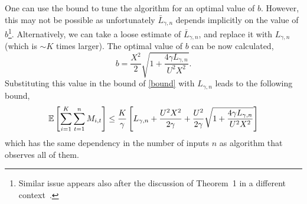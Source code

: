 {One can use the bound to tune the algorithm for an optimal  value of
$b$. However, this may not be possible as unfortunately ${\bar L}_{\gamma,n}$ depends
implicitly on the value of $b$\footnote{Similar issue appears also
  after the discussion of Theorem~1 in a different context~\cite{cesa2006worst}.}.
 Alternatively, we can take a
loose estimate of ${\bar L}_{\gamma,n}$, and replace it with
$L_{\gamma,n}$ (which is $\sim K$ times larger). The optimal value of
$b$ can be now calculated, 
\begin{displaymath}
b=\frac{X^2}{2}{\sqrt{1+\frac{4\gamma L_{\gamma,n}}{U^{2}X^2}}}.
\end{displaymath}
Substituting this value in the bound of \eqref{bound} with
$L_{\gamma,n}$ leads to the following bound, 
\begin{equation*}
\mathbb{E}\left[{\sum_{i=1}^{K}\sum_{t=1}^{n}{M_{i,t}}}\right]
\le\frac{K}{\gamma}\left[{L_{\gamma,n}+\frac{U^{2}X^2}{2\gamma}+\frac{U^{2}}{2\gamma}\sqrt{1+\frac{4\gamma L_{\gamma,n}}{U^{2}X^2}}}\right]
\end{equation*}
which has the same dependency in the number of inputs $n$ as algorithm
that observes all of them.


}
